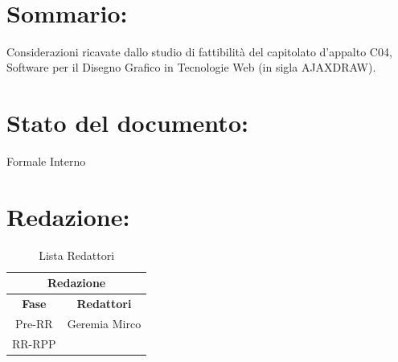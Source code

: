 \newpage

\begin{center} %
	\begin{Huge}	
				\textbf{\TITOLODOC}
			\\
	\end{Huge}
\end{center}

\section*{\LARGE Sommario:} %
\indent \indent
Considerazioni ricavate dallo studio di fattibilit\`a del capitolato d'appalto C04, 
Software per il Disegno Grafico in Tecnologie Web (in sigla AJAXDRAW).


\section*{\LARGE Stato del documento:}
\indent \indent
	Formale Interno

\section*{\LARGE Redazione:}
	\begin{table}[!h]
		\begin{center}
			\begin{tabular}
				{|c|c|}
				\hline
				\multicolumn{2}{|c|}{ \textbf{Redazione} } \\
				\hline
				\textbf{Fase} & \textbf{Redattori} \\
				\hline
				{Pre-RR} & Geremia Mirco \\
				\hline
				{RR-RPP} & \\
				\hline
			\end{tabular}
			\caption{Lista Redattori} %
			\label{tabredazione}
		\end{center}
	\end{table}
	
